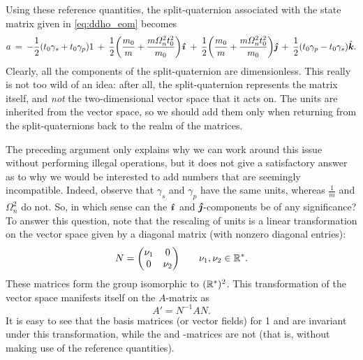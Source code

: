 Using these reference quantities, the split-quaternion associated with the state matrix given in \cref{eq:ddho_eom} becomes
\begin{equation}
    a\:=\: -\frac{1}{2}\qty(t_0\gamma_s + t_0\gamma_p)1\:+\:\frac{1}{2}\qty(\frac{m_0}{m} + \frac{m\Omega_n^2 t_0^2}{m_0})\quati\:+\:\frac{1}{2}\qty(\frac{m_0}{m} + \frac{m\Omega_n^2 t_0^2}{m_0})\quatj\:+\:\frac{1}{2}\qty(t_0\gamma_p - t_0\gamma_s)\quatk. 
    \label{eq:ddho_quat_units}
\end{equation}
Clearly, all the components of the split-quaternion are dimensionless. This really is not too wild of an idea: after all, the split-quaternion represents the matrix itself, and \emph{not} the two-dimensional vector space that it acts on. The units are inherited from the vector space, so we should add them only when returning from the split-quaternions back to the realm of the matrices. 

The preceding argument only explains why we can work around this issue without performing illegal operations, but it does not give a satisfactory answer as to why we would be interested to add numbers that are seemingly incompatible. Indeed, observe that \(\gamma_s\) and \(\gamma_p\) have the same units, whereas \(\tfrac{1}{m}\) and \(\Omega_n^2\) do not. So, in which sense can the \(\quati\) and \(\quatj\)-components be of any significance? To answer this question, note that the rescaling of units is a linear transformation on the vector space given by a diagonal matrix (with nonzero diagonal entries): 
\begin{equation}
     N = \mqty(\dmat[0]{\nu_1}{\nu_2}) \qquad \nu_1, \nu_2 \in \real^*.
\end{equation}
These matrices form the group isomorphic to \((\real^*)^2\). This transformation of the vector space manifests itself on the \(A\)-matrix as 
\begin{equation} 
    A' = N^{-1}A N.
\end{equation}
It is easy to see that the basis matrices (or vector fields) for 1 and \quatk are invariant under this transformation, while the \quati and \quatj-matrices are not (that is, without making use of the reference quantities). 

